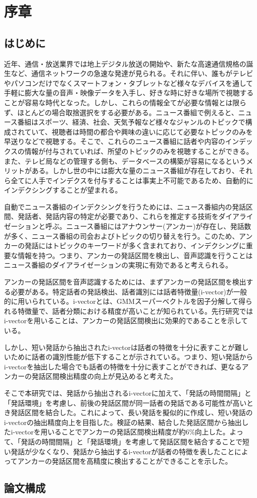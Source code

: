 \chapter{序章}
\section{はじめに}
近年、通信・放送業界では地上デジタル放送の開始や、新たな高速通信規格の誕生など、通信ネットワークの急速な発達が見られる。それに伴い、誰もがテレビやパソコンだけでなくスマートフォン・タブレットなど様々なデバイスを通して手軽に膨大な量の音声・映像データを入手し、好きな時に好きな場所で視聴することが容易な時代となった。しかし、これらの情報全てが必要な情報とは限らず、ほとんどの場合取捨選択をする必要がある。ニュース番組で例えると、ニュース番組はスポーツ、経済、社会、天気予報など様々なジャンルのトピックで構成されていて、視聴者は時間の都合や興味の違いに応じて必要なトピックのみを早送りなどで視聴する。そこで、これらのニュース番組に話者や内容のインデックスの情報が付与されていれば、所望のトピックのみを視聴することができる。また、テレビ局などの管理する側も、データベースの構築が容易になるというメリットがある。しかし世の中には膨大な量のニュース番組が存在しており、それら全てに人手でインデクスを付与することは事実上不可能であるため、自動的にインデクシングすることが望まれる。\par
自動でニュース番組のインデクシングを行うためには、ニュース番組内の発話区間、発話者、発話内容の特定が必要であり、これらを推定する技術をダイアライゼーションと呼ぶ。ニュース番組にはアナウンサー(アンカー)が存在し、発話数が多く、ニュース番組の司会およびトピックの切り替えを行う。このため、アンカーの発話にはトピックのキーワードが多く含まれており、インデクシングに重要な情報を持つ。つまり、アンカーの発話区間を検出し、音声認識を行うことはニュース番組のダイアライゼーションの実現に有効であると考えられる。\par
アンカーの発話区間を音声認識するためには、まずアンカーの発話区間を検出する必要がある。特定話者の発話検出、話者識別には話者特徴量(i-vector)が一般的に用いられている\cite{ogawa_ivector}\cite{nishi_multi}。i-vectorとは、GMMスーパーベクトルを因子分解して得られる特徴量で、話者分類における精度が高いことが知られている。先行研究\cite{nozaki_gakuseikai}ではi-vectorを用いることは、アンカーの発話区間検出に効果的であることを示している。\par
しかし、短い発話から抽出されたi-vectorは話者の特徴を十分に表すことが難しいために話者の識別性能が低下することが示されている\cite{panaiv}。つまり、短い発話からi-vectorを抽出した場合でも話者の特徴を十分に表すことができれば、更なるアンカーの発話区間検出精度の向上が見込めると考えた。\par
そこで本研究では、発話から抽出されるi-vectorに加えて、「発話の時間間隔」と「発話環境」を考慮し、前後の発話区間が同一話者の発話である可能性が高いとき発話区間を結合した。これによって、長い発話を擬似的に作成し、短い発話のi-vectorの抽出精度向上を目指した。検証の結果、結合した発話区間から抽出したi-vectorを用いることでアンカーの発話区間検出精度が約6\%向上した。よって、「発話の時間間隔」と「発話環境」を考慮して発話区間を結合することで短い発話が少なくなり、発話から抽出するi-vectorが話者の特徴を表したことによってアンカーの発話区間を高精度に検出することができることを示した。

\section{論文構成}

